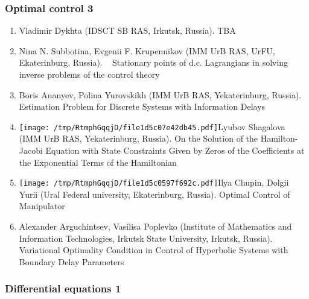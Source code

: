 \documentclass[
]{article}
\providecommand{\tightlist}{%
  \setlength{\itemsep}{0pt}\setlength{\parskip}{0pt}}
\begin{document}
\hypertarget{oc3}{%
\subsubsection{Optimal control 3}\label{oc3}}

\begin{enumerate}
\def\labelenumi{\arabic{enumi}.}
\tightlist
\item
  Vladimir Dykhta (IDSCT SB RAS, Irkutsk, Russia). TBA
\item
  Nina N. Subbotina, Evgenii F. Krupennikov (IMM UrB RAS, UrFU,
  Ekaterinburg, Russia). ~ Stationary points of d.c. Lagrangians in
  solving inverse problems of the control theory
\item
  Boris Ananyev, Polina Yurovskikh (IMM UrB RAS, Yekaterinburg, Russia).
  Estimation Problem for Discrete Systems with Information Delays
\item
  \protect\texttt{[image: /tmp/RtmphGqqjD/file1d5c07e42db45.pdf]}Lyubov
  Shagalova (IMM UrB RAS, Yekaterinburg, Russia). On the Solution of the
  Hamilton-Jacobi Equation with State Constraints Given by Zeros of the
  Coefficients at the Exponential Terms of the Hamiltonian
\item
  \protect\texttt{[image: /tmp/RtmphGqqjD/file1d5c0597f692c.pdf]}Ilya
  Chupin, Dolgii Yurii (Ural Federal university, Ekaterinburg, Russia).
  Optimal Control of Manipulator
\item
  Alexander Arguchintsev, Vasilisa Poplevko (Institute of Mathematics
  and Information Technologies, Irkutsk State University, Irkutsk,
  Russia). Variational Optimality Condition in Control of Hyperbolic
  Systems with Boundary Delay Parameters
\end{enumerate}

\hypertarget{de1}{%
\subsubsection{Differential equations 1}\label{de1}}
\end{document}
